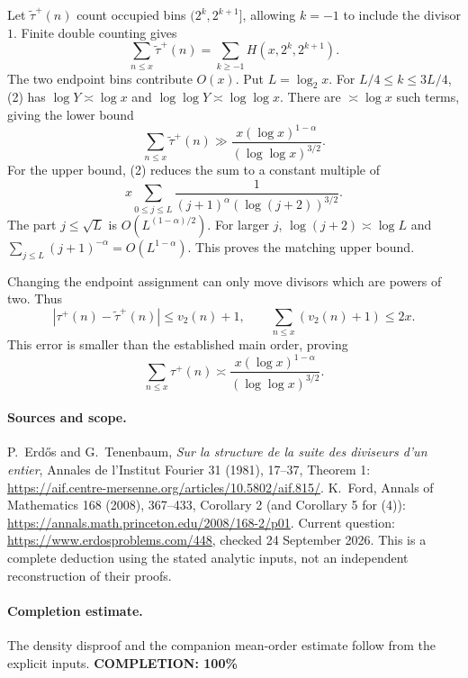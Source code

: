 Let \(\widetilde\tau^+(n)\) count occupied bins \((2^k,2^{k+1}]\),
allowing \(k=-1\) to include the divisor \(1\).
Finite double counting gives
\[
 \sum_{n\leq x}\widetilde\tau^+(n)
 =\sum_{k\geq-1}H(x,2^k,2^{k+1}).
 \tag{3}
\]
The two endpoint bins contribute \(O(x)\).
Put \(L=\log_2 x\). For \(L/4\leq k\leq3L/4\), (2)
has \(\log Y\asymp\log x\) and
\(\log\log Y\asymp\log\log x\).
There are \(\asymp\log x\) such terms, giving the lower bound
\[
 \sum_{n\leq x}\widetilde\tau^+(n)
 \gg \frac{x(\log x)^{1-\alpha}}{(\log\log x)^{3/2}}.
\]
For the upper bound, (2) reduces the sum to a constant multiple of
\[
 x\sum_{0\leq j\leq L}
 \frac1{(j+1)^\alpha(\log(j+2))^{3/2}}.
\]
The part \(j\leq\sqrt L\) is \(O(L^{(1-\alpha)/2})\).
For larger \(j\), \(\log(j+2)\asymp\log L\) and
\(\sum_{j\leq L}(j+1)^{-\alpha}=O(L^{1-\alpha})\).
This proves the matching upper bound.

Changing the endpoint assignment can only move divisors which are
powers of two. Thus
\[
 |\tau^+(n)-\widetilde\tau^+(n)|\leq v_2(n)+1,\qquad
 \sum_{n\leq x}(v_2(n)+1)\leq2x.
\]
This error is smaller than the established main order, proving
\[
 \sum_{n\leq x}\tau^+(n)\asymp
 \frac{x(\log x)^{1-\alpha}}{(\log\log x)^{3/2}}.
 \tag{4}
\]

\paragraph{Sources and scope.}
P.~Erd\H{o}s and G.~Tenenbaum,
\emph{Sur la structure de la suite des diviseurs d'un entier},
Annales de l'Institut Fourier 31 (1981), 17--37, Theorem 1:
\url{https://aif.centre-mersenne.org/articles/10.5802/aif.815/}.
K.~Ford, Annals of Mathematics 168 (2008), 367--433,
Corollary 2 (and Corollary 5 for (4)):
\url{https://annals.math.princeton.edu/2008/168-2/p01}.
Current question: \url{https://www.erdosproblems.com/448},
checked 24 September 2026.
This is a complete deduction using the stated analytic inputs,
not an independent reconstruction of their proofs.

\paragraph{Completion estimate.}
The density disproof and the companion mean-order estimate follow from the explicit inputs.
\textbf{COMPLETION: 100\%}
